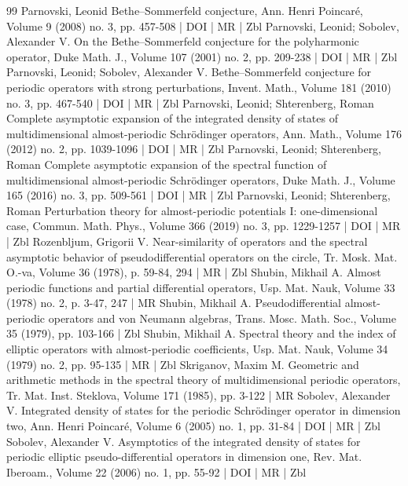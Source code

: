 \documentclass[10pt]{amsart}
\theoremstyle{definition}\newtheorem{defi}[theo]{Definition}\newtheorem{rema}[theo]{Remark}\newtheorem{exam}[theo]{Example}\newtheorem{nota}[theo]{Notation}
\begin{document}
\begin{thebibliography}{99}
Parnovski, Leonid Bethe–Sommerfeld conjecture, Ann. Henri Poincaré, Volume 9 (2008) no. 3, pp. 457-508 | DOI | MR | Zbl
Parnovski, Leonid; Sobolev, Alexander V. On the Bethe–Sommerfeld conjecture for the polyharmonic operator, Duke Math. J., Volume 107 (2001) no. 2, pp. 209-238 | DOI | MR | Zbl
Parnovski, Leonid; Sobolev, Alexander V. Bethe–Sommerfeld conjecture for periodic operators with strong perturbations, Invent. Math., Volume 181 (2010) no. 3, pp. 467-540 | DOI | MR | Zbl
Parnovski, Leonid; Shterenberg, Roman Complete asymptotic expansion of the integrated density of states of multidimensional almost-periodic Schrödinger operators, Ann. Math., Volume 176 (2012) no. 2, pp. 1039-1096 | DOI | MR | Zbl
Parnovski, Leonid; Shterenberg, Roman Complete asymptotic expansion of the spectral function of multidimensional almost-periodic Schrödinger operators, Duke Math. J., Volume 165 (2016) no. 3, pp. 509-561 | DOI | MR | Zbl
Parnovski, Leonid; Shterenberg, Roman Perturbation theory for almost-periodic potentials I: one-dimensional case, Commun. Math. Phys., Volume 366 (2019) no. 3, pp. 1229-1257 | DOI | MR | Zbl
Rozenbljum, Grigorii V. Near-similarity of operators and the spectral asymptotic behavior of pseudodifferential operators on the circle, Tr. Mosk. Mat. O.-va, Volume 36 (1978), p. 59-84, 294 | MR | Zbl
Shubin, Mikhail A. Almost periodic functions and partial differential operators, Usp. Mat. Nauk, Volume 33 (1978) no. 2, p. 3-47, 247 | MR
Shubin, Mikhail A. Pseudodifferential almost-periodic operators and von Neumann algebras, Trans. Mosc. Math. Soc., Volume 35 (1979), pp. 103-166 | Zbl
Shubin, Mikhail A. Spectral theory and the index of elliptic operators with almost-periodic coefficients, Usp. Mat. Nauk, Volume 34 (1979) no. 2, pp. 95-135 | MR | Zbl
Skriganov, Maxim M. Geometric and arithmetic methods in the spectral theory of multidimensional periodic operators, Tr. Mat. Inst. Steklova, Volume 171 (1985), pp. 3-122 | MR
Sobolev, Alexander V. Integrated density of states for the periodic Schrödinger operator in dimension two, Ann. Henri Poincaré, Volume 6 (2005) no. 1, pp. 31-84 | DOI | MR | Zbl
Sobolev, Alexander V. Asymptotics of the integrated density of states for periodic elliptic pseudo-differential operators in dimension one, Rev. Mat. Iberoam., Volume 22 (2006) no. 1, pp. 55-92 | DOI | MR | Zbl

\end{thebibliography}
\end{document}
